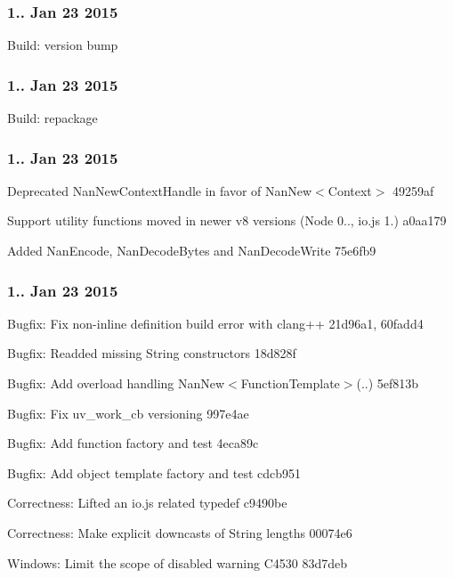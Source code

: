 \subsubsection*{1.. Jan 23 2015}


\begin{DoxyItemize}
\item Build\+: version bump
\end{DoxyItemize}

\subsubsection*{1.. Jan 23 2015}


\begin{DoxyItemize}
\item Build\+: repackage
\end{DoxyItemize}

\subsubsection*{1.. Jan 23 2015}


\begin{DoxyItemize}
\item Deprecated {\ttfamily Nan\+New\+Context\+Handle} in favor of {\ttfamily Nan\+New$<$Context$>$} 49259af
\item Support utility functions moved in newer v8 versions (Node 0.., io.\+js 1.) a0aa179
\item Added {\ttfamily Nan\+Encode}, {\ttfamily Nan\+Decode\+Bytes} and {\ttfamily Nan\+Decode\+Write} 75e6fb9
\end{DoxyItemize}

\subsubsection*{1.. Jan 23 2015}


\begin{DoxyItemize}
\item Bugfix\+: Fix non-\/inline definition build error with clang++ 21d96a1, 60fadd4
\item Bugfix\+: Readded missing String constructors 18d828f
\item Bugfix\+: Add overload handling Nan\+New$<$\+Function\+Template$>$(..) 5ef813b
\item Bugfix\+: Fix uv\+\_\+work\+\_\+cb versioning 997e4ae
\item Bugfix\+: Add function factory and test 4eca89c
\item Bugfix\+: Add object template factory and test cdcb951
\item Correctness\+: Lifted an io.\+js related typedef c9490be
\item Correctness\+: Make explicit downcasts of String lengths 00074e6
\item Windows\+: Limit the scope of disabled warning C4530 83d7deb
\end{DoxyItemize}

